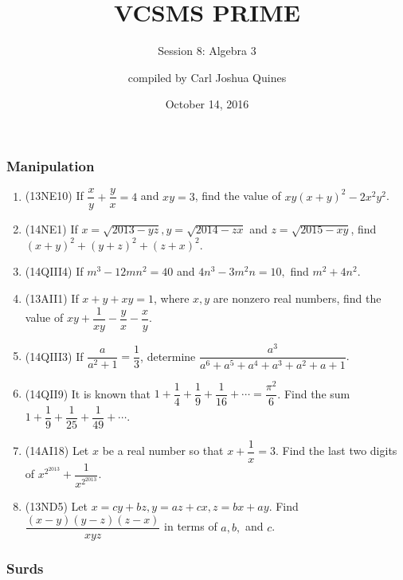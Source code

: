 \documentclass[10pt,paper=letter]{scrartcl}
\begin{document}
\title{VCSMS PRIME}
\subtitle{Session 8: Algebra 3}
\author{compiled by Carl Joshua Quines}
\date{October 14, 2016}

\maketitle

\subsubsection*{Manipulation}

\begin{enumerate}

\item (13NE10) If $\dfrac{x}{y} + \dfrac{y}{x} = 4$ and $xy = 3$, find the value of $xy(x+y)^2 - 2x^2y^2$.

\item (14NE1) If $x = \sqrt{2013-yz}, y = \sqrt{2014-zx}$ and $z = \sqrt{2015-xy}$, find $(x+y)^2 + (y+z)^2 + (z+x)^2$.

\item (14QIII4) If $m^3 - 12mn^2 = 40$ and $4n^3 - 3m^2n = 10,$ find $m^2 + 4n^2$.

\item (13AII1) If $x + y + xy = 1$, where $x, y$ are nonzero real numbers, find the value of $xy + \dfrac{1}{xy} - \dfrac{y}{x} - \dfrac{x}{y}$.

\item (14QIII3) If $\dfrac{a}{a^2 + 1} = \dfrac{1}{3}$, determine $\dfrac{a^3}{a^6 + a^5 + a^4 + a^3 + a^2 + a + 1}.$

\item (14QII9) It is known that $1 + \dfrac{1}{4} + \dfrac{1}{9} + \dfrac{1}{16} + \cdots = \dfrac{\pi^2}{6}$. Find the sum $1 + \dfrac{1}{9} + \dfrac{1}{25} + \dfrac{1}{49} + \cdots.$

\item (14AI18) Let $x$ be a real number so that $x + \dfrac{1}{x} = 3$. Find the last two digits of $x^{2^{2013}} + \dfrac{1}{x^{2^{2013}}}.$

\item (13ND5) Let $x = cy + bz, y = az + cx, z = bx + ay$. Find $\dfrac{(x-y)(y-z)(z-x)}{xyz}$ in terms of $a, b,$ and $c$.

\end{enumerate}

\subsubsection*{Surds}
\end{document}

